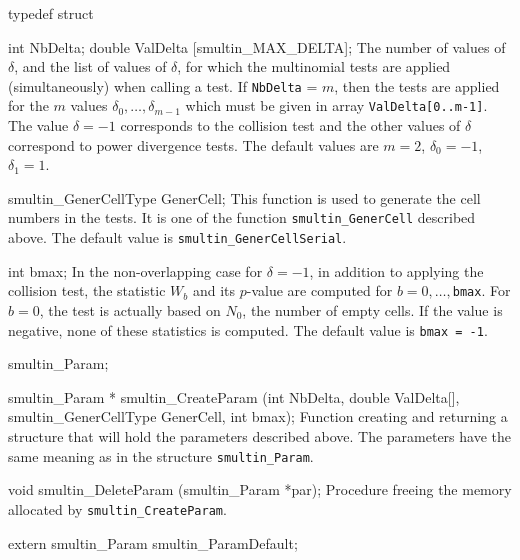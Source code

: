 typedef struct {

   int NbDelta;
   double ValDelta [smultin_MAX_DELTA];
\endcode
 \tabb
  The number of values of $\delta$, and the list of values of $\delta$,
  for which the multinomial tests are applied (simultaneously)
  when calling a test.  If {\tt NbDelta} = $m$, then the 
  tests are applied for the $m$ values $\delta_0,\dots,\delta_{m-1}$
  which must be given in array {\tt ValDelta[0..m-1]}.
  The value $\delta = -1$ corresponds to the collision test
  and the other values of $\delta$ correspond to power divergence tests.
  The default values are $m=2$, $\delta_0 = -1$, $\delta_1 = 1$.
 \endtabb
\code

   smultin_GenerCellType GenerCell;
\endcode
\tabb
  This function is used to generate the cell numbers in the tests.
  It is one of the function {\tt smultin\_GenerCell} described above.
  The default value is {\tt smultin\_GenerCellSerial}.
\endtabb
\code

   int bmax;
\endcode
 \tabb  In the non-overlapping case for $\delta = -1$, in addition to 
   applying the collision test, the statistic $W_b$ and its $p$-value
   are computed for $b=0,\dots,${\tt bmax}.
   For $b=0$, the test is actually based on $N_0$, the number of
   empty cells.
   If the value is negative, none of these statistics is computed.
   The default value is {\tt bmax = -1}.
 \endtabb
\code

} smultin_Param;


smultin_Param * smultin_CreateParam (int NbDelta, double ValDelta[],
                                     smultin_GenerCellType GenerCell,
                                     int bmax);
\endcode
 \tab 
  Function creating and returning a structure that will hold the 
  parameters described above.  The parameters have 
  the same meaning as in the structure {\tt smultin\_Param}.
 \endtab
\code


void smultin_DeleteParam (smultin_Param *par);
\endcode
 \tab 
  Procedure freeing the memory allocated by {\tt smultin\_CreateParam}.
 \endtab

\hide
\code

extern smultin_Param smultin_ParamDefault;
\endcode
\endhide



\ifdetailed  %


